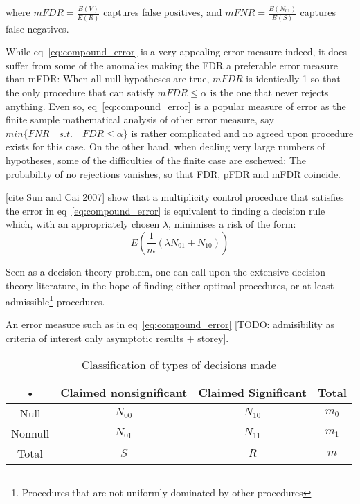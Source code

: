 \documentclass[draft,12pt]{article}
\begin{document}
where $mFDR=\frac{E(V)}{E(R)}$ captures false positives, and 
$mFNR=\frac{E(N_{01})}{E(S)}$ captures false negatives.

While eq~\ref{eq:compound_error} is a very appealing error measure indeed, it does suffer from some of the anomalies making the FDR a preferable error measure than mFDR: When all null hypotheses are true, $mFDR$ is identically 1 so that the only procedure that can satisfy $mFDR\leq \alpha$ is the one that never rejects anything. 
Even so, eq~\ref{eq:compound_error} is a popular measure of error as the finite sample mathematical analysis of other error measure, say $min\{FNR \quad s.t. \quad FDR\leq \alpha \}$ is rather complicated and no agreed upon procedure exists for this case. 
On the other hand, when dealing very large numbers of hypotheses, some of the difficulties of the finite case are eschewed: The probability of no rejections vanishes, so that FDR, pFDR and mFDR coincide. 



[cite Sun and Cai 2007] show that a multiplicity control procedure that satisfies the error in eq~\ref{eq:compound_error} is equivalent to finding a decision rule which, with an appropriately chosen $\lambda$, minimises a risk of the form:
\begin{equation} \label{eq:multiplicity_risk}
E \left( \frac{1}{m} \left( \lambda N_{01} + N_{10}   \right)   \right)
\end{equation}

Seen as a decision theory problem, one can call upon the extensive decision theory literature, in the hope of finding either optimal procedures, or at least admissible\footnote{Procedures that are not uniformly dominated by other procedures} procedures. 


An error measure such as in eq~\ref{eq:compound_error} 
[TODO: admisibility as criteria of interest only asymptotic results + storey].






\begin{table}
  \centering
\begin{tabular}{|c|c|c|c|}
\hline \rule[-1ex]{0pt}{1.5ex} • & Claimed nonsignificant & Claimed Significant & Total \\ 
\hline
\hline \rule[-1ex]{0pt}{1.5ex} Null & $N_{00}$ & $N_{10}$ & $m_0$ \\ 
\hline \rule[-1ex]{0pt}{1.5ex} Nonnull & $N_{01}$ & $N_{11}$ & $m_1$ \\ 
\hline \rule[-1ex]{0pt}{1.5ex} Total & $S$ & $R$ & $m$ \\ 
\hline 
\end{tabular} 
  \caption{Classification of types of decisions made}
  \label{tab:event_notation}
\end{table}
\end{document}
